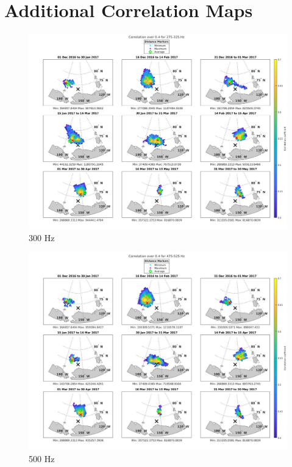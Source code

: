 \pagebreak

\section{Additional Correlation Maps} \label{apdx_maps} 

\begin{figure}[h]
\centering
\includegraphics[scale=0.3]{Figures/megamap_noisland_0.4_300.jpg}
\caption{300 Hz}
\end{figure}

\begin{figure}[p]
\centering
\includegraphics[scale=0.3]{Figures/megamap_noisland_0.4_500.jpg}
\caption{500 Hz}
\end{figure}


